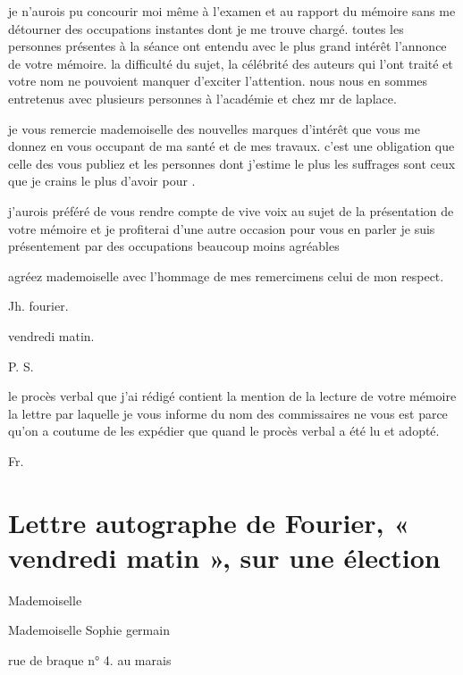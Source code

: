 \documentclass[11pt,a4paper]{article}
\begin{document}
je n'aurois pu concourir moi même à l'examen et au rapport du mémoire sans me
détourner des occupations instantes dont je me trouve chargé. toutes les
personnes présentes à la séance ont entendu avec le plus grand intérêt
l'annonce de votre mémoire. la difficulté du sujet, la célébrité des auteurs
qui l'ont traité et votre nom ne pouvoient manquer d'exciter l'attention. nous
nous en sommes entretenus avec plusieurs personnes à l'académie et chez mr de
laplace.

je vous remercie mademoiselle des nouvelles marques d'intérêt que vous me
donnez en vous occupant de ma santé et de mes travaux. c'est une obligation
 que celle des \ill{} vous publiez et les personnes dont
j'estime le plus les suffrages sont ceux que je crains le plus d'avoir pour
\struck{\ill{}} .


j'aurois préféré de vous rendre compte de vive voix au sujet de la
présentation de votre mémoire et je profiterai d'une autre occasion pour vous
en parler je suis présentement  par des occupations beaucoup
moins agréables

agréez mademoiselle avec l'hommage de mes remercimens celui de mon respect.

Jh. fourier.

vendredi matin.

P. S.

le procès verbal que j'ai rédigé contient la mention de la lecture de votre
mémoire la lettre par laquelle je vous informe du nom des commissaires ne vous
est \ill{} parce qu'on a coutume de les expédier \ill{} que quand le procès
verbal a été lu et adopté.

Fr.


\section{Lettre autographe de Fourier, « vendredi matin », sur une élection}

Mademoiselle

Mademoiselle Sophie germain

rue de braque n° 4. au marais
\end{document}
